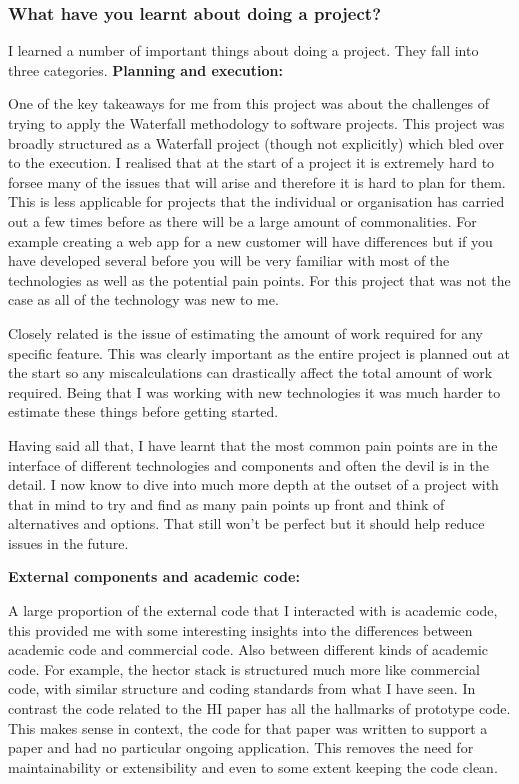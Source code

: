 \documentclass[]{../resources/final_report}
\begin{document}
\subsubsection{What have you learnt about doing a project?}

I learned a number of important things about doing a project. They fall into three categories.
\textbf{Planning and execution:}

One of the key takeaways for me from this project was about the challenges of trying to apply the Waterfall
methodology to software projects. This project was broadly structured as a Waterfall project (though not
explicitly) which bled over to the execution. I realised that at the start of a project it is extremely 
hard to forsee many of the issues that will arise and therefore it is hard to plan for them. This is less 
applicable for projects that the individual or organisation has carried out a few times before as there
will be a large amount of commonalities. For example creating a web app for a new customer will have 
differences but if you have developed several before you will be very familiar with most of the technologies
as well as the potential pain points. For this project that was not the case as all of the technology was 
new to me. 

Closely related is the issue of estimating the amount of work required for any specific feature. This 
was clearly important as the entire project is planned out at the start so any miscalculations can 
drastically affect the total amount of work required. Being that I was working with new technologies
it was much harder to estimate these things before getting started.

Having said all that, I have learnt that the most common pain points are in the interface of different 
technologies and components and often the devil is in the detail. I now know to dive into much more 
depth at the outset of a project with that in mind to try and find as many pain points up front and 
think of alternatives and options. That still won't be perfect but it should help reduce issues in the 
future.

\textbf{External components and academic code:}

A large proportion of the external code that I interacted with is academic code, this provided me with 
some interesting insights into the differences between academic code and commercial code. Also between
different kinds of academic code. For example, the hector stack is structured much more like commercial
code, with similar structure and coding standards from what I have seen. In contrast the code related 
to the HI paper has all the hallmarks of prototype code. This makes sense in context, the code for that
paper was written to support a paper and had no particular ongoing application. This removes the need 
for maintainability or extensibility and even to some extent keeping the code clean.
\end{document}
